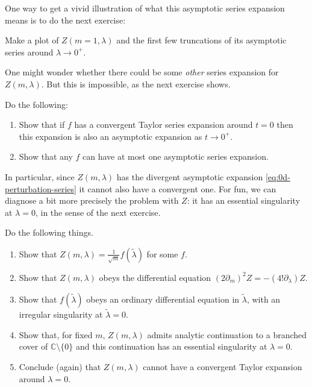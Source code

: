 \documentclass[12pt,letterpaper,reqno]{article}
\numberwithin{equation}{section}
\newcommand{\C}{\ensuremath{\mathbb C}}
\newcommand{\ti}[1]{\textit{#1}}
\begin{document}
One way to get a vivid illustration of what this asymptotic series
expansion means is to do the next exercise:

\begin{exercise} Make a plot of $Z(m=1,\lambda)$
and the first few truncations of its asymptotic series around $\lambda \to 0^+$.
\end{exercise}

One might wonder whether there could be some \ti{other} series expansion for $Z(m,\lambda)$.
But this is impossible, as the next exercise shows.

\begin{exercise} Do the following:
\begin{enumerate}
\item Show that if $f$ has a convergent Taylor series expansion around $t = 0$ then this expansion
is also an asymptotic expansion as $t \to 0^+$.
\item Show that any $f$ can have at most one asymptotic series expansion.
\end{enumerate}
\end{exercise}

In particular, since $Z(m,\lambda)$ has the divergent asymptotic 
expansion \eqref{eq:0d-perturbation-series} it cannot also
have a convergent one.
For fun, we can diagnose a bit more precisely the problem with $Z$: it has an essential 
singularity at $\lambda = 0$, in the sense of the next exercise.
\begin{exercise} Do the following things.
\begin{enumerate}
\item Show that $Z(m,\lambda) = \frac{1}{\sqrt{m}} f(\tilde\lambda)$ for some $f$.
\item Show that $Z(m,\lambda)$ obeys the differential equation $(2\partial_m)^2 Z = -(4! \partial_\lambda) Z$.
\item Show that $f(\tilde\lambda)$ obeys an ordinary differential equation in $\tilde\lambda$,
with an irregular singularity at $\tilde\lambda = 0$.
\item Show that, for fixed $m$, $Z(m, \lambda)$ admits analytic continuation to a branched cover of $\C \setminus \{ 0 \}$
and this continuation has an essential singularity at $\lambda = 0$.
\item Conclude (again) that $Z(m, \lambda)$ cannot have
a convergent Taylor expansion around $\lambda = 0$.
\end{enumerate}
\end{exercise}
\end{document}
